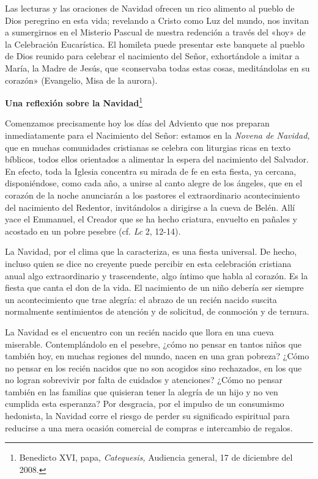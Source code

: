 \documentclass[]{article}
\begin{document}
Las lecturas y las oraciones de Navidad ofrecen un rico alimento al
pueblo de Dios peregrino en esta vida; revelando a Cristo como Luz del
mundo, nos invitan a sumergirnos en el Misterio Pascual de nuestra
redención a través del «hoy» de la Celebración Eucarística. El homileta
puede presentar este banquete al pueblo de Dios reunido para celebrar el
nacimiento del Señor, exhortándole a imitar a María, la Madre de Jesús,
que «conservaba todas estas cosas, meditándolas en su corazón»
(Evangelio, Misa de la aurora).

\textbf{Una reflexión sobre la Navidad}\footnote{Benedicto XVI, papa,
  \emph{Catequesis,} Audiencia general, 17 de diciembre del 2008.}

Comenzamos precisamente hoy los días del Adviento que nos preparan
inmediatamente para el Nacimiento del Señor: estamos en la \emph{Novena
de Navidad,} que en muchas comunidades cristianas se celebra con
liturgias ricas en texto bíblicos, todos ellos orientados a alimentar la
espera del nacimiento del Salvador. En efecto, toda la Iglesia concentra
su mirada de fe en esta fiesta, ya cercana, disponiéndose, como cada
año, a unirse al canto alegre de los ángeles, que en el corazón de la
noche anunciarán a los pastores el extraordinario acontecimiento del
nacimiento del Redentor, invitándolos a dirigirse a la cueva de Belén.
Allí yace el Emmanuel, el Creador que se ha hecho criatura, envuelto en
pañales y acostado en un pobre pesebre (cf. \emph{Lc} 2, 12-14).

La Navidad, por el clima que la caracteriza, es una fiesta universal. De
hecho, incluso quien se dice no creyente puede percibir en esta
celebración cristiana anual algo extraordinario y trascendente, algo
íntimo que habla al corazón. Es la fiesta que canta el don de la vida.
El nacimiento de un niño debería ser siempre un acontecimiento que trae
alegría: el abrazo de un recién nacido suscita normalmente sentimientos
de atención y de solicitud, de conmoción y de ternura.

La Navidad es el encuentro con un recién nacido que llora en una cueva
miserable. Contemplándolo en el pesebre, ¿cómo no pensar en tantos niños
que también hoy, en muchas regiones del mundo, nacen en una gran
pobreza? ¿Cómo no pensar en los recién nacidos que no son acogidos sino
rechazados, en los que no logran sobrevivir por falta de cuidados y
atenciones? ¿Cómo no pensar también en las familias que quisieran tener
la alegría de un hijo y no ven cumplida esta esperanza? Por desgracia,
por el impulso de un consumismo hedonista, la Navidad corre el riesgo de
perder su significado espiritual para reducirse a una mera ocasión
comercial de compras e intercambio de regalos.
\end{document}
